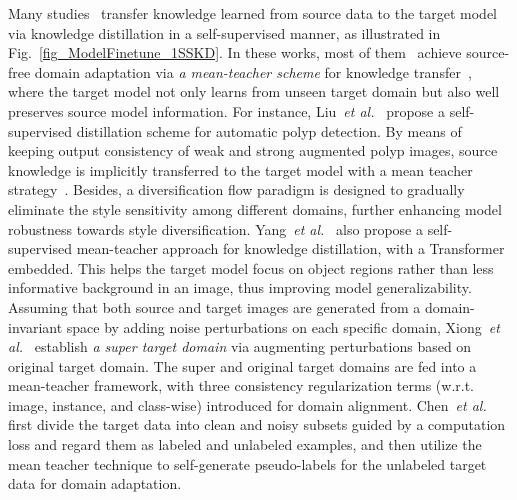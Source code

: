 \documentclass[10pt,journal,compsoc]{IEEEtran}
\def\etal{{\em et al.}}
\begin{document}
Many studies~\cite{liu2022sourcepolyp, yang2021transformer, xiong2021source, chen2021self, liu2021graph, yu2022source, tang2021model, vs2022target} transfer knowledge learned from source data to the target model via knowledge distillation in a self-supervised manner, as illustrated in Fig.~\ref{fig_ModelFinetune_1SSKD}. 
In these works, most of them~\cite{liu2022sourcepolyp, yang2021transformer, xiong2021source, chen2021self, liu2021graph} achieve source-free domain adaptation via \emph{a mean-teacher scheme} for knowledge transfer~\cite{tarvainen2017mean}, where the target model not only learns from unseen target domain but also well preserves source model information.
For instance, Liu~\etal~\cite{liu2022sourcepolyp} propose a self-supervised distillation scheme for automatic polyp detection.
By means of keeping output consistency of weak and strong augmented polyp images, source knowledge is implicitly transferred to the target model with a mean teacher strategy~\cite{tarvainen2017mean}.
Besides, a diversification flow paradigm is designed to gradually eliminate the style sensitivity among different domains, further enhancing model robustness towards style diversification.
Yang~\etal~\cite{yang2021transformer} also propose a self-supervised mean-teacher approach for knowledge distillation, with a Transformer~\cite{dosovitskiy2020image} embedded.
This helps the target model focus on object regions rather than less informative background in an image, thus improving model generalizability.
Assuming that both source and target images are generated from a domain-invariant space by adding noise perturbations on each specific domain, Xiong~\etal~\cite{xiong2021source} establish \emph{a super target domain} via augmenting perturbations based on original target domain.
The super and original target domains are fed into a mean-teacher framework, with three consistency regularization terms (w.r.t. image, instance, and class-wise) introduced for domain alignment.
Chen~\etal~\cite{chen2021self} first divide the target data into clean and noisy subsets guided by a computation loss and regard them as labeled and unlabeled examples, and then utilize the mean teacher technique to self-generate pseudo-labels for the unlabeled target data for domain adaptation.
\end{document}
